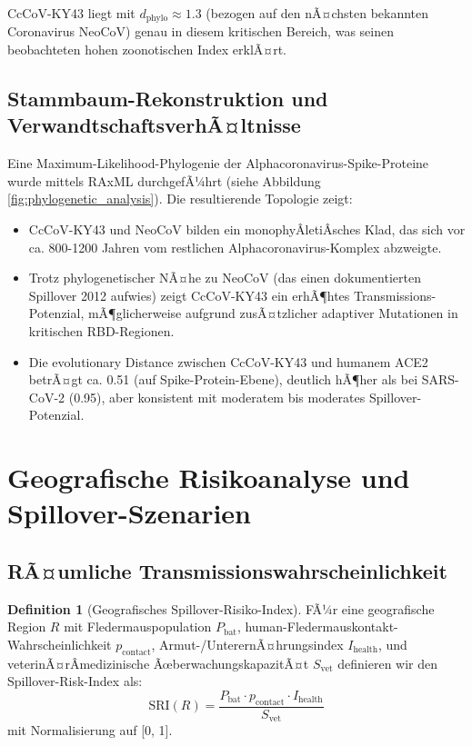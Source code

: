 ﻿\documentclass[11pt,a4paper]{article}
\theoremstyle{definition}
\newtheorem{definition}[theorem]{Definition}
\begin{document}
CcCoV-KY43 liegt mit $d_{\text{phylo}} \approx 1.3$ (bezogen auf den nÃ¤chsten bekannten Coronavirus NeoCoV) genau in diesem kritischen Bereich, was seinen beobachteten hohen zoonotischen Index erklÃ¤rt.

\subsection{Stammbaum-Rekonstruktion und VerwandtschaftsverhÃ¤ltnisse}

Eine Maximum-Likelihood-Phylogenie der Alphacoronavirus-Spike-Proteine wurde mittels RAxML durchgefÃ¼hrt (siehe Abbildung \ref{fig:phylogenetic_analysis}). Die resultierende Topologie zeigt:

\begin{itemize}
\item CcCoV-KY43 und NeoCoV bilden ein monophyÂ­letiÂ­sches Klad, das sich vor ca. 800-1200 Jahren vom restlichen Alphacoronavirus-Komplex abzweigte.
\item Trotz phylogenetischer NÃ¤he zu NeoCoV (das einen dokumentierten Spillover 2012 aufwies) zeigt CcCoV-KY43 ein erhÃ¶htes Transmissions-Potenzial, mÃ¶glicherweise aufgrund zusÃ¤tzlicher adaptiver Mutationen in kritischen RBD-Regionen.
\item Die evolutionary Distance zwischen CcCoV-KY43 und humanem ACE2 betrÃ¤gt ca. 0.51 (auf Spike-Protein-Ebene), deutlich hÃ¶her als bei SARS-CoV-2 (0.95), aber konsistent mit moderatem bis moderates Spillover-Potenzial.
\end{itemize}

\section{Geografische Risikoanalyse und Spillover-Szenarien}

\subsection{RÃ¤umliche Transmissionswahrscheinlichkeit}

\begin{definition}[Geografisches Spillover-Risiko-Index]
FÃ¼r eine geografische Region $R$ mit Fledermauspopulation $P_{\text{bat}}$, human-Fledermauskontakt-Wahrscheinlichkeit $p_{\text{contact}}$, Armut-/Unterer\-nÃ¤hrungsindex $I_{\text{health}}$, und veterinÃ¤rÂ­medizinische ÃœberwachungskapazitÃ¤t $S_{\text{vet}}$ definieren wir den Spillover-Risk-Index als:
\[
\text{SRI}(R) = \frac{P_{\text{bat}} \cdot p_{\text{contact}} \cdot I_{\text{health}}}{S_{\text{vet}}}
\]
mit Normalisierung auf [0, 1].
\end{definition}
\end{document}
